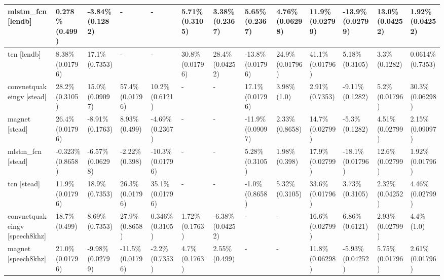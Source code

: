 \begin{table}[]
\begin{adjustwidth}{-1in}{-1in}
\begin{tabular}{|l|l|l|l|l|l|l|l|l|l|l|l|l|}
mlstm\_fcn [lendb] & 0.278\%  (0.499) & -3.84\%  (0.1282) & - & - & 5.71\%  (0.3105) & 3.38\%  (0.2367) & 5.65\%  (0.2367) & 4.76\%  (0.06298) & \cellcolor{green} 11.9\% (0.02799) & \cellcolor{red} -13.9\% (0.02799) & \cellcolor{green} 13.0\% (0.04252) & \cellcolor{green} 1.92\% (0.04252) \\ \hline
tcn [lendb] & \cellcolor{green} 8.38\% (0.01796) & 17.1\%  (0.7353) & - & - & \cellcolor{green} 30.8\% (0.01796) & \cellcolor{green} 28.4\% (0.04252) & \cellcolor{red} -13.8\% (0.01796) & \cellcolor{green} 24.9\% (0.01796) & \cellcolor{green} 41.1\% (0.01796) & 5.18\%  (0.3105) & 3.3\%  (0.1282) & 0.0614\%  (0.7353) \\ \hline
convnetquakeingv [stead] & 28.2\%  (0.3105) & 15.0\%  (0.09097) & \cellcolor{green} 57.4\% (0.01796) & 10.2\%  (0.6121) & - & - & \cellcolor{green} 17.1\% (0.01796) & 3.98\%  (1.0) & 2.91\%  (0.7353) & -9.11\%  (0.1282) & \cellcolor{green} 5.2\% (0.01796) & 30.3\%  (0.06298) \\ \hline
magnet [stead] & \cellcolor{green} 26.4\% (0.01796) & -8.91\%  (0.1763) & 8.93\%  (0.499) & -4.69\%  (0.2367) & - & - & -11.9\%  (0.09097) & 2.33\%  (0.8658) & \cellcolor{green} 14.7\% (0.02799) & -5.3\%  (0.1282) & \cellcolor{green} 4.51\% (0.02799) & 2.15\%  (0.09097) \\ \hline
mlstm\_fcn [stead] & -0.323\%  (0.8658) & -6.57\%  (0.06298) & -2.22\%  (0.398) & \cellcolor{red} -10.3\% (0.01796) & - & - & 5.28\%  (0.3105) & 1.98\%  (0.398) & \cellcolor{green} 17.9\% (0.02799) & \cellcolor{red} -18.1\% (0.01796) & \cellcolor{green} 12.6\% (0.02799) & \cellcolor{green} 1.92\% (0.01796) \\ \hline
tcn [stead] & \cellcolor{green} 11.9\% (0.01796) & 18.9\%  (0.7353) & \cellcolor{green} 26.3\% (0.01796) & \cellcolor{green} 35.1\% (0.01796) & - & - & -1.0\%  (0.8658) & 5.32\%  (0.3105) & \cellcolor{green} 33.6\% (0.01796) & 3.73\%  (0.3105) & \cellcolor{green} 2.32\% (0.04252) & \cellcolor{green} 4.46\% (0.02799) \\ \hline
convnetquakeingv [speech8khz] & 18.7\%  (0.499) & 8.69\%  (0.7353) & 27.9\%  (0.8658) & 0.346\%  (0.3105) & 1.72\%  (0.1763) & \cellcolor{red} -6.38\% (0.04252) & - & - & \cellcolor{green} 16.6\% (0.02799) & 6.86\%  (0.6121) & \cellcolor{green} 2.93\% (0.02799) & 4.4\%  (1.0) \\ \hline
magnet [speech8khz] & \cellcolor{green} 21.0\% (0.01796) & \cellcolor{red} -9.98\% (0.02799) & \cellcolor{red} -11.5\% (0.01796) & -2.2\%  (0.7353) & 4.7\%  (0.1763) & 2.55\%  (0.499) & - & - & 11.8\%  (0.06298) & \cellcolor{red} -5.93\% (0.04252) & \cellcolor{green} 5.75\% (0.01796) & \cellcolor{green} 2.61\% (0.01796) \\ \hline

\end{tabular}
\end{adjustwidth}
\end{table}

